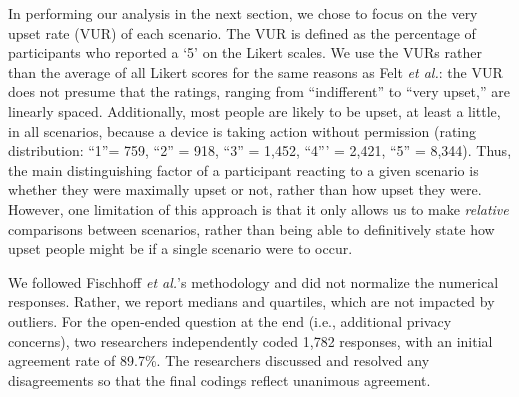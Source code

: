 In performing our analysis in the next section, we chose to focus on the very upset rate (VUR) of each scenario.  The VUR is defined as the percentage of participants who reported a `5' on the Likert scales. 
We use the VURs rather than the average of all Likert scores for the same reasons as Felt {\it et al.}: the VUR does not presume that the ratings, ranging from ``indifferent'' to ``very upset,'' are linearly spaced. Additionally, most people are likely to be upset, at least a little, in all scenarios, because a device is taking action without permission (rating distribution: ``1''= 759, ``2'' = 918, ``3'' = 1,452, ``4''' = 2,421, ``5'' = 8,344). Thus, the main distinguishing factor of a participant reacting to a given scenario is whether they were maximally upset or not, rather than how upset they were. However, one limitation of this approach is that it only allows us to make {\it relative} comparisons between scenarios, rather than being able to definitively state how upset people might be if a single scenario were to occur.

We followed Fischhoff {\it et al.}'s methodology and did not normalize the numerical responses. Rather, we report medians and quartiles, which are not impacted by outliers. For the open-ended question at the end (i.e., additional privacy concerns), two researchers independently coded 1,782 responses, with an initial agreement rate of 89.7\%. The researchers discussed and resolved any disagreements so that the final codings reflect unanimous agreement.

